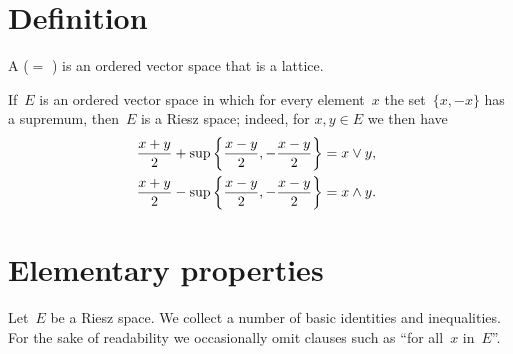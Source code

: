 \documentclass[main.tex]{subfiles}
\begin{document}
\section{Definition}
A  ($=$ )
is an ordered vector space that is a lattice.

If~$E$ is an ordered vector space 
in which for every element~$x$
the set~$\{x,-x\}$ has a supremum,
then~$E$ is a Riesz space;
indeed,
for $x,y\in E$
we then have
\begin{align*}
\frac{x+y}{2} + \sup\left\{ \frac{x-y}{2}, -\frac{x-y}{2} \right\} 
  & = x\vee y\textnormal{,} \\ 
\frac{x+y}{2} - \sup\left\{ \frac{x-y}{2}, -\frac{x-y}{2} \right\}
  & = x\wedge y\textnormal{. }
\end{align*}
%
%
%
%
\section{Elementary properties}
Let~$E$ be a Riesz space. 
We collect a number of basic identities and inequalities.
For the sake of readability
we occasionally omit clauses such as ``for all~$x$ in~$E$''.
\end{document}
